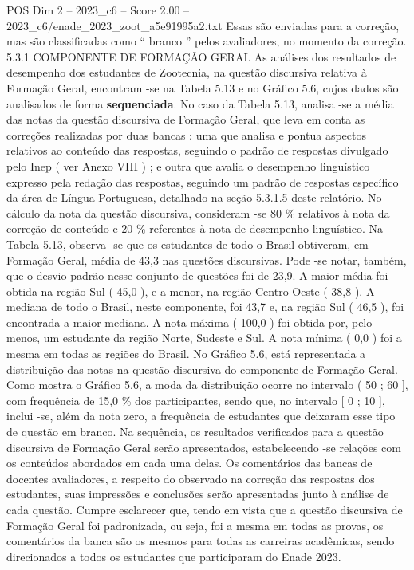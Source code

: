 \begin{textsample}{POS Dim 2 – 2023\_c6 – Score 2.00 – 2023\_c6/enade\_2023\_zoot\_a5e91995a2.txt}
Essas são enviadas para a correção, mas são classificadas como “ branco ” pelos avaliadores, no momento da correção. 5.3.1 COMPONENTE DE FORMAÇÃO GERAL As análises dos resultados de desempenho dos estudantes de Zootecnia, na questão discursiva relativa à Formação Geral, encontram -se na Tabela 5.13 e no Gráfico 5.6, cujos dados são analisados de forma \textbf{sequenciada}.
No caso da Tabela 5.13, analisa -se a média das notas da questão discursiva de Formação Geral, que leva em conta as correções realizadas por duas bancas : uma que analisa e pontua aspectos relativos ao conteúdo das respostas, seguindo o padrão de respostas divulgado pelo Inep ( ver Anexo VIII ) ; e outra que avalia o desempenho linguístico expresso pela redação das respostas, seguindo um padrão de respostas específico da área de Língua Portuguesa, detalhado na seção 5.3.1.5 deste relatório.
No cálculo da nota da questão discursiva, consideram -se 80 \% relativos à nota da correção de conteúdo e 20 \% referentes à nota de desempenho linguístico.
Na Tabela 5.13, observa -se que os estudantes de todo o Brasil obtiveram, em Formação Geral, média de 43,3 nas questões discursivas.
Pode -se notar, também, que o desvio-padrão nesse conjunto de questões foi de 23,9.
A maior média foi obtida na região Sul ( 45,0 ), e a menor, na região Centro-Oeste ( 38,8 ).
A mediana de todo o Brasil, neste componente, foi 43,7 e, na região Sul ( 46,5 ), foi encontrada a maior mediana.
A nota máxima ( 100,0 ) foi obtida por, pelo menos, um estudante da região Norte, Sudeste e Sul.
A nota mínima ( 0,0 ) foi a mesma em todas as regiões do Brasil.
No Gráfico 5.6, está representada a distribuição das notas na questão discursiva do componente de Formação Geral.
Como mostra o Gráfico 5.6, a moda da distribuição ocorre no intervalo ( 50 ; 60 ], com frequência de 15,0 \% dos participantes, sendo que, no intervalo [ 0 ; 10 ], inclui -se, além da nota zero, a frequência de estudantes que deixaram esse tipo de questão em branco.
Na sequência, os resultados verificados para a questão discursiva de Formação Geral serão apresentados, estabelecendo -se relações com os conteúdos abordados em cada uma delas.
Os comentários das bancas de docentes avaliadores, a respeito do observado na correção das respostas dos estudantes, suas impressões e conclusões serão apresentadas junto à análise de cada questão.
Cumpre esclarecer que, tendo em vista que a questão discursiva de Formação Geral foi padronizada, ou seja, foi a mesma em todas as provas, os comentários da banca são os mesmos para todas as carreiras acadêmicas, sendo direcionados a todos os estudantes que participaram do Enade 2023.

\end{textsample}
